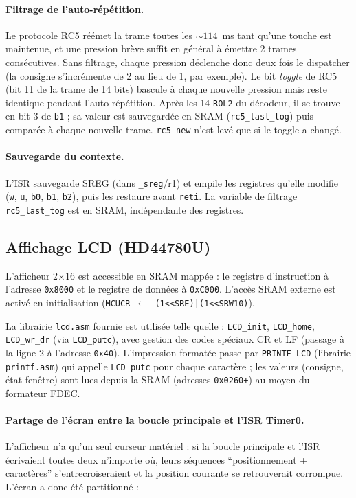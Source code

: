 \documentclass[11pt]{article}
\begin{document}
\paragraph{Filtrage de l'auto-répétition.} Le protocole RC5 réémet la trame toutes les ${\sim}114$~ms tant qu'une touche est maintenue, et une pression brève suffit en général à émettre 2 trames consécutives. Sans filtrage, chaque pression déclenche donc deux fois le dispatcher (la consigne s'incrémente de 2 au lieu de 1, par exemple). Le bit \textit{toggle} de RC5 (bit 11 de la trame de 14 bits) bascule à chaque nouvelle pression mais reste identique pendant l'auto-répétition. Après les 14 \texttt{ROL2} du décodeur, il se trouve en bit 3 de \texttt{b1} ; sa valeur est sauvegardée en SRAM (\texttt{rc5\_last\_tog}) puis comparée à chaque nouvelle trame. \texttt{rc5\_new} n'est levé que si le toggle a changé.

\paragraph{Sauvegarde du contexte.} L'ISR sauvegarde SREG (dans \texttt{\_sreg}/r1) et empile les registres qu'elle modifie (\texttt{w}, \texttt{u}, \texttt{b0}, \texttt{b1}, \texttt{b2}), puis les restaure avant \texttt{reti}. La variable de filtrage \texttt{rc5\_last\_tog} est en SRAM, indépendante des registres.

\subsection{Affichage LCD (HD44780U)}

L'afficheur 2$\times$16 est accessible en SRAM mappée : le registre d'instruction à l'adresse \texttt{0x8000} et le registre de données à \texttt{0xC000}. L'accès SRAM externe est activé en initialisation (\texttt{MCUCR $\leftarrow$ (1{<}{<}SRE)|(1{<}{<}SRW10)}).

La librairie \texttt{lcd.asm} fournie est utilisée telle quelle : \texttt{LCD\_init}, \texttt{LCD\_home}, \texttt{LCD\_wr\_dr} (via \texttt{LCD\_putc}), avec gestion des codes spéciaux CR et LF (passage à la ligne 2 à l'adresse \texttt{0x40}). L'impression formatée passe par \texttt{PRINTF LCD} (librairie \texttt{printf.asm}) qui appelle \texttt{LCD\_putc} pour chaque caractère ; les valeurs (consigne, état fenêtre) sont lues depuis la SRAM (adresses \texttt{0x0260+}) au moyen du formateur FDEC.

\paragraph{Partage de l'écran entre la boucle principale et l'ISR Timer0.} L'afficheur n'a qu'un seul curseur matériel : si la boucle principale et l'ISR écrivaient toutes deux n'importe où, leurs séquences ``positionnement + caractères'' s'entrecroiseraient et la position courante se retrouverait corrompue. L'écran a donc été partitionné :
\end{document}
